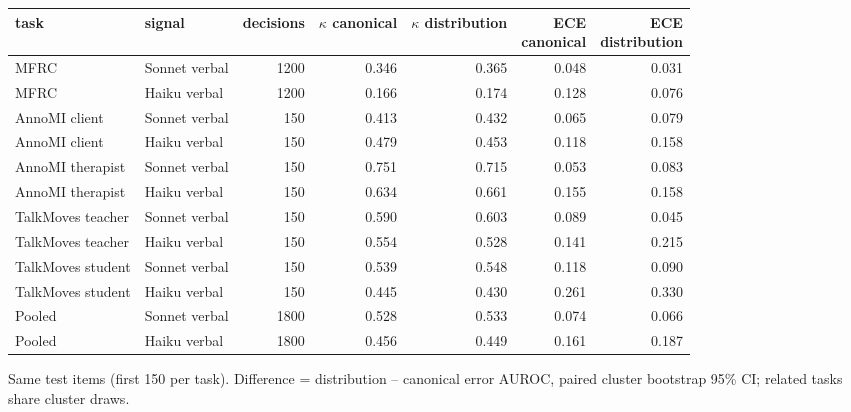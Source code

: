 \begin{table}[t]
\begin{adjustbox}{max width=\linewidth}
\begin{tabular}{llrrrrr}
\toprule
task & signal & decisions & $\kappa$ canonical & \makecell[br]{$\kappa$ \\{} distribution} & \makecell[br]{ECE \\{} canonical} & \makecell[br]{ECE \\{} distribution} \\
\midrule
MFRC & Sonnet verbal & 1200 & 0.346 & 0.365 & 0.048 & 0.031 \\
MFRC & Haiku verbal & 1200 & 0.166 & 0.174 & 0.128 & 0.076 \\
AnnoMI client & Sonnet verbal & 150 & 0.413 & 0.432 & 0.065 & 0.079 \\
AnnoMI client & Haiku verbal & 150 & 0.479 & 0.453 & 0.118 & 0.158 \\
AnnoMI therapist & Sonnet verbal & 150 & 0.751 & 0.715 & 0.053 & 0.083 \\
AnnoMI therapist & Haiku verbal & 150 & 0.634 & 0.661 & 0.155 & 0.158 \\
TalkMoves teacher & Sonnet verbal & 150 & 0.590 & 0.603 & 0.089 & 0.045 \\
TalkMoves teacher & Haiku verbal & 150 & 0.554 & 0.528 & 0.141 & 0.215 \\
TalkMoves student & Sonnet verbal & 150 & 0.539 & 0.548 & 0.118 & 0.090 \\
TalkMoves student & Haiku verbal & 150 & 0.445 & 0.430 & 0.261 & 0.330 \\
Pooled & Sonnet verbal & 1800 & 0.528 & 0.533 & 0.074 & 0.066 \\
Pooled & Haiku verbal & 1800 & 0.456 & 0.449 & 0.161 & 0.187 \\
\bottomrule
\end{tabular}
\end{adjustbox}
\par\smallskip\footnotesize\raggedright Same test items (first 150 per task). Difference = distribution -- canonical error AUROC, paired cluster bootstrap 95\% CI; related tasks share cluster draws.
\end{table}
